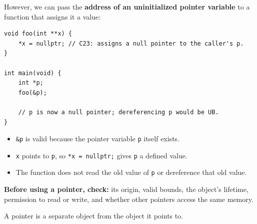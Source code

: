 \documentclass[11pt,a4paper]{article}
\begin{document}
However, we can pass the
\textbf{address of an uninitialized pointer variable}
to a function that assigns it a value:

\begin{lstlisting}[style=cscode]
void foo(int **x) {
    *x = nullptr; // C23: assigns a null pointer to the caller's p.
}

int main(void) {
    int *p;
    foo(&p);

    // p is now a null pointer; dereferencing p would be UB.
}
\end{lstlisting}

\begin{itemize}
    \item \texttt{\&p} is valid because the pointer variable
          \texttt{p} itself exists.
    \item \texttt{x} points to \texttt{p}, so
          \texttt{*x = nullptr;} gives \texttt{p} a defined value.
    \item The function does not read the old value of
          \texttt{p} or dereference that old value.
\end{itemize}

\textbf{Before using a pointer, check:}
its origin, valid bounds, the object's lifetime, permission to
read or write, and whether other pointers access the same memory.


A pointer is a separate object from the object it points to.
\end{document}
